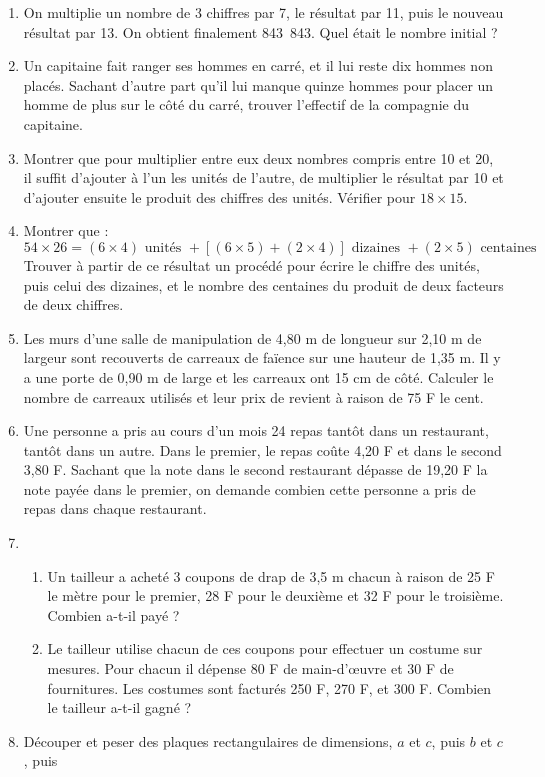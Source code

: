 \documentclass[12 pt]{report}
\theoremstyle{plain}
\newcounter{n}
\begin{document}
\begin{enumerate}
\item On multiplie un nombre de 3 chiffres par 7, le résultat par 11, puis le nouveau résultat par 13. On obtient finalement 843~843. Quel était le nombre initial ? 
\item Un capitaine fait ranger ses hommes en carré, et il lui reste dix hommes non placés. Sachant d'autre part qu'il lui manque quinze hommes pour placer un homme de plus sur le côté du carré, trouver l'effectif de la compagnie du capitaine. 
\item Montrer que pour multiplier entre eux deux nombres compris entre 10 et 20, il suffit d'ajouter à l'un les unités de l'autre, de multiplier le résultat par 10 et d'ajouter ensuite le produit des chiffres des unités. Vérifier pour $18 \times 15$. 
\item Montrer que : 
\[ 54 \times 26 = (6 \times 4) \text{ unités } + 
[(6 \times 5) + (2 \times 4) ]\text{ dizaines } + 
(2 \times 5) \text{ centaines } \]
Trouver à partir de ce résultat un procédé pour écrire le chiffre des unités, puis celui des dizaines, et le nombre des centaines du produit de deux facteurs de deux chiffres. 
\item Les murs d'une salle de manipulation de 
4,80 m de longueur sur 2,10 m de largeur sont recouverts de carreaux de faïence sur une hauteur de 1,35 m. Il y a une porte de 0,90 m de large et les carreaux ont 15 cm de côté. Calculer le nombre de carreaux utilisés et leur prix de revient à raison 
de 75 F le cent. 
\item Une personne a pris au cours d'un mois 24 repas
tantôt dans un restaurant, tantôt dans un autre. Dans 
le premier, le repas coûte 4,20 F et dans le second
3,80 F. Sachant que la note dans le second restaurant
dépasse de 19,20 F la note payée dans le premier, on demande combien cette personne a pris de repas dans chaque restaurant. 
\item \begin{enumerate}
\item Un tailleur a acheté 3 coupons de drap de 3,5 m
chacun à raison de 25 F le mètre pour le premier, 28 F
pour le deuxième et 32 F pour le troisième. Combien
a-t-il payé ? 
\item Le tailleur utilise chacun de ces coupons pour 
effectuer un costume sur mesures. Pour chacun il 
dépense 80 F de main-d'œuvre et 30 F de fournitures.
Les costumes sont facturés 250 F, 270 F, et 300 F. 
Combien le tailleur a-t-il gagné ? 
\end{enumerate}
\item Découper et peser des plaques rectangulaires de dimensions, $a$ et $c$, puis $b$ et $c$, puis 

\end{enumerate}
\end{document}
